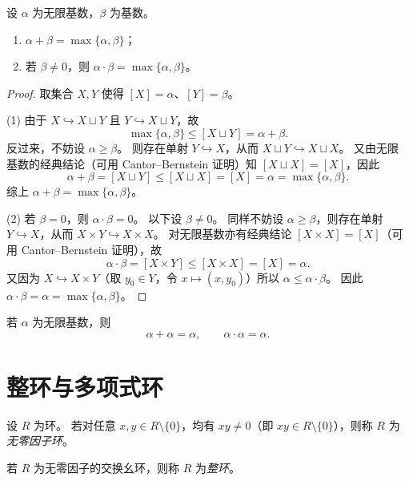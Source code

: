 \documentclass[lang=cn,a4paper,newtx]{elegantbook}
\begin{document}
\begin{theorem}[无限基数的运算]
  设 $\alpha$ 为无限基数，$\beta$ 为基数。
  \begin{enumerate}
    \item $\alpha+\beta=\max\{\alpha,\beta\}$；
    \item 若 $\beta\ne 0$，则 $\alpha\cdot\beta=\max\{\alpha,\beta\}$。
  \end{enumerate}
\end{theorem}

\begin{proof}
  取集合 $X,Y$ 使得 $[X]=\alpha$、$[Y]=\beta$。

  (1) 由于 $X\hookrightarrow X\sqcup Y$ 且 $Y\hookrightarrow X\sqcup Y$，故
  \[
    \max\{\alpha,\beta\}\le [X\sqcup Y]=\alpha+\beta.
  \]
  反过来，不妨设 $\alpha\ge\beta$。
  则存在单射 $Y\hookrightarrow X$，从而 $X\sqcup Y\hookrightarrow X\sqcup X$。
  又由无限基数的经典结论（可用 Cantor--Bernstein 证明）知 $[X\sqcup X]=[X]$，因此
  \[
    \alpha+\beta=[X\sqcup Y]\le [X\sqcup X]=[X]=\alpha=\max\{\alpha,\beta\}.
  \]
  综上 $\alpha+\beta=\max\{\alpha,\beta\}$。

  (2) 若 $\beta=0$，则 $\alpha\cdot\beta=0$。
  以下设 $\beta\ne 0$。
  同样不妨设 $\alpha\ge\beta$，则存在单射 $Y\hookrightarrow X$，从而 $X\times Y\hookrightarrow X\times X$。
  对无限基数亦有经典结论 $[X\times X]=[X]$（可用 Cantor--Bernstein 证明），故
  \[
    \alpha\cdot\beta=[X\times Y]\le [X\times X]=[X]=\alpha.
  \]
  又因为 $X\hookrightarrow X\times Y$（取 $y_0\in Y$，令 $x\mapsto(x,y_0)$）所以 $\alpha\le \alpha\cdot\beta$。
  因此 $\alpha\cdot\beta=\alpha=\max\{\alpha,\beta\}$。
\end{proof}

\begin{corollary}
  若 $\alpha$ 为无限基数，则
  \[
    \alpha+\alpha=\alpha,\qquad \alpha\cdot\alpha=\alpha.
  \]
\end{corollary}

\section{整环与多项式环}

\begin{definition}[无零因子环]
  设 $R$ 为环。
  若对任意 $x,y\in R\setminus\{0\}$，均有 $xy\ne 0$（即 $xy\in R\setminus\{0\}$），则称 $R$ 为\emph{无零因子环}。
\end{definition}

\begin{definition}[整环]
  若 $R$ 为无零因子的交换幺环，则称 $R$ 为\emph{整环}。
\end{definition}
\end{document}
